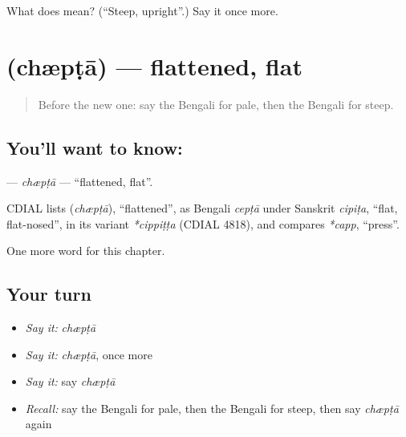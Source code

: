 \begin{tcolorbox}[breakable,colback=teal!4,colframe=teal!35!black,title={Before you move on}]
What does  mean? (\textquotedblleft{}Steep, upright\textquotedblright{}.) Say it once more.
\end{tcolorbox}
\section[\texorpdfstring{\bn{চ্যাপ্টা} (chæpṭā)}{চ্যাপ্টা (chæpṭā)}]{ (chæpṭā) — flattened, flat}

\label{lesson:BN-C247-chpta}



\begin{quote}
Before the new one: say the Bengali for pale, then the Bengali for steep.
\end{quote}

\subsection*{You'll want to know: }
\textbf{} — \emph{chæpṭā} — \textquotedblleft{}flattened, flat\textquotedblright{}.

\begin{cousinweb}
CDIAL lists \textbf{} (\emph{chæpṭā}), \textquotedblleft{}flattened\textquotedblright{}, as Bengali \emph{cepṭā} under Sanskrit \emph{cipiṭa}, \textquotedblleft{}flat, flat-nosed\textquotedblright{}, in its variant \emph{*cippiṭṭa} (CDIAL 4818), and compares \emph{*capp}, \textquotedblleft{}press\textquotedblright{}.
\end{cousinweb}

\begin{grammarlens}[title={What you've built}]
One more word for this chapter.
\end{grammarlens}

\subsection*{Your turn}
\begin{itemize}
\raggedright
  \item \emph{Say it:} \emph{chæpṭā}
  \item \emph{Say it:} \emph{chæpṭā}, once more
  \item \emph{Say it:} say \emph{chæpṭā}
  \item \emph{Recall:} say the Bengali for pale, then the Bengali for steep, then say \emph{chæpṭā} again
\end{itemize}

